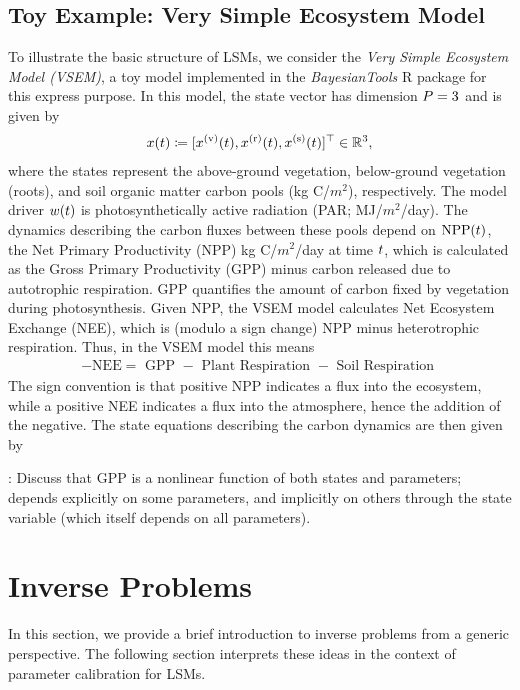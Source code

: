 \documentclass[12pt]{article}
\begin{document}
\subsection{Toy Example: Very Simple Ecosystem Model}
To illustrate the basic structure of LSMs, we consider the \textit{Very Simple Ecosystem Model (VSEM)}, a toy model implemented 
in the \textit{BayesianTools} R package for this express purpose. In this model, the state vector has dimension $P=3$ and is given by 
\begin{align*}
x(t) \coloneqq [{x}^{(\textrm{v})}(t), {x}^{(\textrm{r})}(t), {x}^{(\textrm{s})}(t)]^\top \in \mathbb{R}^{3}, 
\end{align*}
where the states represent the above-ground vegetation, below-ground vegetation (roots), and soil organic matter 
carbon pools (\textrm{kg C/$m^2$}), respectively. The model driver $w(t)$ is photosynthetically active radiation 
(PAR; \textrm{MJ/$m^2$/day}). The dynamics describing the carbon fluxes between these pools depend on 
$\textrm{NPP}(t)$, the Net Primary Productivity (NPP) \textrm{kg C/$m^2$/day} at time $t$, 
which is calculated as the Gross Primary Productivity (GPP) minus carbon released due to autotrophic respiration.
GPP quantifies the amount of carbon fixed by vegetation during photosynthesis. Given NPP, the VSEM model 
calculates Net Ecosystem Exchange (NEE), which is (modulo a sign change) 
NPP minus heterotrophic respiration. Thus, in the VSEM model this means 
\begin{align}
-\text{NEE} = \text{ GPP } - \text{ Plant Respiration } - \text{ Soil Respiration } 
\end{align}
The sign convention is that positive NPP indicates a flux into the ecosystem, while a positive NEE indicates a flux into the atmosphere, hence the addition of the negative. 
The state equations describing the carbon dynamics are then given by



\todo: Discuss that GPP is a nonlinear function of both states and parameters; depends explicitly on some parameters, and implicitly on others through the 
state variable (which itself depends on all parameters). 

\section{Inverse Problems}
In this section, we provide a brief introduction to inverse problems from a generic perspective. The following section 
interprets these ideas in the context of parameter calibration for LSMs. 
\end{document}
